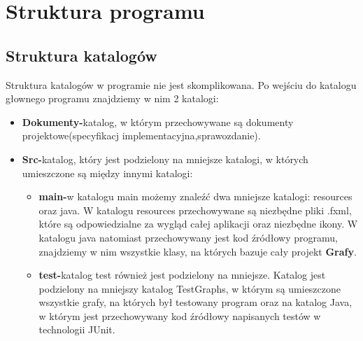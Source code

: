 \documentclass[10pt]{article}
\begin{document}
\section{Struktura programu}
\subsection{Struktura katalogów}
Struktura katalogów w programie nie jest skomplikowana. Po wejściu do katalogu głownego programu znajdziemy w nim 2 katalogi:
\begin{itemize}
    \item \textbf{Dokumenty-}katalog, w którym przechowywane są dokumenty projektowe(specyfikacj implementacyjna,sprawozdanie).
    \item \textbf{Src-}katalog, który jest podzielony na mniejsze katalogi, w których umieszczone są między innymi katalogi:
    \begin{itemize}
        \item \textbf{main-}w katalogu main możemy znaleźć dwa mniejsze katalogi: resources oraz java. W katalogu resources przechowywane są niezbędne pliki .fxml, które są odpowiedzialne za wygląd całej aplikacji oraz niezbędne ikony. W katalogu java natomiast przechowywany jest kod źródłowy programu, znajdziemy w nim wszystkie klasy, na których bazuje cały projekt \textbf{Grafy}.
        \item \textbf{test-}katalog test również jest podzielony na mniejsze. Katalog jest podzielony na mniejszy katalog TestGraphs, w którym są umieszczone wszystkie grafy, na których był testowany program oraz na katalog Java, w którym jest przechowywany kod źródłowy napisanych testów w technologii JUnit.
    \end{itemize}
    
\end{itemize}
\end{document}
